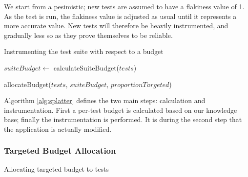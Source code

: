 {We start from a pesimistic; new tests are assumed to have a flakiness value of 1. As the test is run, the flakiness value is adjusted as usual until it represents a more accurate value. New tests will therefore be heavily instrumented, and gradually less so as they prove themselves to be reliable.

\begin{algorithm}[h]
\caption{Instrumenting the test suite with respect to a budget}
\label{alg:splatter}
\begin{algorithmic}
	\Statex


	\State $suiteBudget \gets$ calculateSuiteBudget($tests$)
	\Statex

	\State allocateBudget($tests$, $suiteBudget$, $proportionTargeted$)
	\Statex

	\EndFor

	\EndFunction

	\Statex


	\Statex


	\EndFunction
\end{algorithmic}
\end{algorithm}

Algorithm \ref{alg:splatter} defines the two main steps: calculation and instrumentation. First a per-test budget is calculated based on our knowledge base; finally the instrumentation is performed. It is during the second step that the application is actually modified.


\subsubsection{Targeted Budget Allocation}

\begin{algorithm}[H]
\caption{Allocating targeted budget to tests}
\label{alg:allocateTargetedBudget}
\begin{algorithmic}


\end{algorithmic}
\end{algorithm}}
